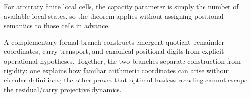 \documentclass[11pt]{article}
\theoremstyle{definition}
\begin{document}
For arbitrary finite local cells, the capacity parameter is simply the number of available local states, so the theorem applies without assigning positional semantics to those cells in advance.

A complementary formal branch constructs emergent quotient--remainder coordinates, carry transport, and canonical positional digits from explicit operational hypotheses. Together, the two branches separate construction from rigidity: one explains how familiar arithmetic coordinates can arise without circular definitions; the other proves that optimal lossless recoding cannot escape the residual/carry projective dynamics.



\end{document}
